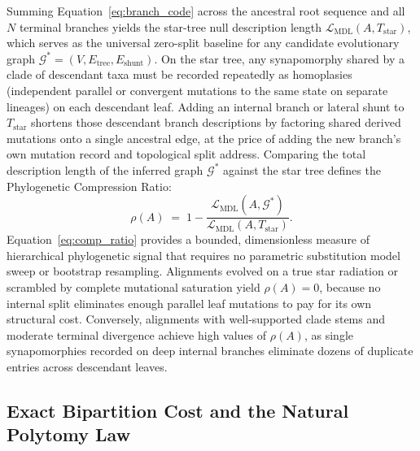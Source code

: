 \documentclass[11pt,a4paper]{article}
\begin{document}
Summing Equation~\eqref{eq:branch_code} across the ancestral root sequence and all $N$ terminal branches yields the star-tree null description length $\mathcal{L}_{\text{MDL}}(A, T_{\text{star}})$, which serves as the universal zero-split baseline for any candidate evolutionary graph $\mathcal{G}^* = (V, E_{\text{tree}}, E_{\text{shunt}})$. On the star tree, any synapomorphy shared by a clade of descendant taxa must be recorded repeatedly as homoplasies (independent parallel or convergent mutations to the same state on separate lineages) on each descendant leaf. Adding an internal branch or lateral shunt to $T_{\text{star}}$ shortens those descendant branch descriptions by factoring shared derived mutations onto a single ancestral edge, at the price of adding the new branch's own mutation record and topological split address. Comparing the total description length of the inferred graph $\mathcal{G}^*$ against the star tree defines the Phylogenetic Compression Ratio:
\begin{equation}
    \rho(A) \;=\; 1 - \frac{\mathcal{L}_{\text{MDL}}(A, \mathcal{G}^*)}{\mathcal{L}_{\text{MDL}}(A, T_{\text{star}})}.
    \label{eq:comp_ratio}
\end{equation}
Equation~\eqref{eq:comp_ratio} provides a bounded, dimensionless measure of hierarchical phylogenetic signal that requires no parametric substitution model sweep or bootstrap resampling. Alignments evolved on a true star radiation or scrambled by complete mutational saturation yield $\rho(A) = 0$, because no internal split eliminates enough parallel leaf mutations to pay for its own structural cost. Conversely, alignments with well-supported clade stems and moderate terminal divergence achieve high values of $\rho(A)$, as single synapomorphies recorded on deep internal branches eliminate dozens of duplicate entries across descendant leaves.

\subsection{Exact Bipartition Cost and the Natural Polytomy Law}
\end{document}
